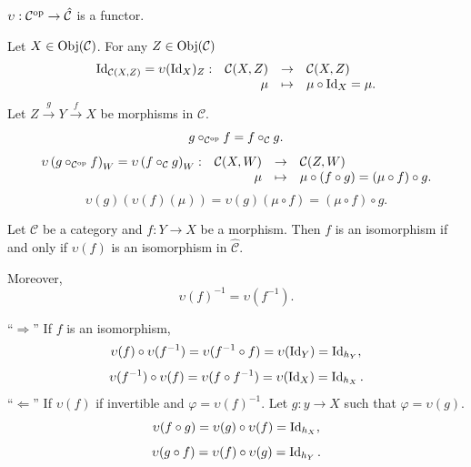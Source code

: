 \begin{propositionenv}
    $\upsilon: \mathcal{C}^{\mathrm{op}}\rightarrow\hat{\mathcal{C}}$ is a functor.
\end{propositionenv}
\begin{proofenv}
    Let $X\in \operatorname{\mathrm{Obj}}(\mathcal{C})$. For any $Z\in \operatorname{\mathrm{Obj}}(\mathcal{C})$
    $$\begin{array}{rrcl}
        \operatorname{\mathrm{Id}}_{\mathcal{C}(X,Z)}=\upsilon(\operatorname{\mathrm{Id}}_{X})_Z:&\mathcal{C}(X,Z)&\rightarrow&\mathcal{C}(X,Z)\\
        &\mu&\mapsto&\mu\circ\operatorname{\mathrm{Id}}_X=\mu.
    \end{array}
    $$
    Let $Z\overset{g}{\longrightarrow}Y\overset{f}{\longrightarrow}X$ be morphisms in $\mathcal{C}$.
    $$g\circ_{\mathcal{C}^{\mathrm{op}}} f=f\circ_{\mathcal{C}} g.$$
    $$\begin{array}{rrcl}
        \upsilon\left(g\circ_{\mathcal{C}^{\mathrm{op}}} f\right)_{W}= \upsilon\left(f\circ_{\mathcal{C}}g\right)_{W} :& \mathcal{C}(X,W)&\rightarrow &\mathcal{C}(Z,W)\\
        &\mu &\mapsto & \mu\circ \left(f\circ g\right)= \left(\mu\circ f\right)\circ g.
    \end{array}
    $$
    $$\upsilon(g)\left(\upsilon(f)(\mu)\right) = \upsilon(g)\left(\mu\circ f\right) = \left(\mu\circ f\right)\circ g.$$
\end{proofenv}
\begin{propositionenv}
    Let $\mathcal{C}$ be a category and $f:Y\rightarrow X$ be a morphism. Then $f$ is an isomorphism if and only if $\upsilon(f)$ is an isomorphism in $\hat{\mathcal{C}}$.

    Moreover, $$\upsilon(f)^{-1} = \upsilon(f^{-1}).$$
\end{propositionenv}
\begin{proofenv}\quad \newline
    ``$\Rightarrow$'' If $f$ is an isomorphism,
    $$ \upsilon(f)\circ \upsilon(f^{-1}) = \upsilon(f^{-1}\circ f) = \upsilon(\operatorname{\mathrm{Id}}_Y) = \operatorname{\mathrm{Id}}_{h_Y},$$
    $$ \upsilon(f^{-1})\circ \upsilon(f) = \upsilon(f\circ f^{-1}) = \upsilon(\operatorname{\mathrm{Id}}_X) =\operatorname{\mathrm{Id}}_{h_X}.$$
    ``$\Leftarrow$'' If $\upsilon(f)$ if invertible and $\varphi = \upsilon(f)^{-1}$. Let $g:y\rightarrow X$ such that $\varphi=\upsilon(g)$.
    $$\upsilon(f\circ g) =\upsilon(g)\circ \upsilon(f) =\operatorname{\mathrm{Id}}_{h_X},$$
    $$\upsilon(g\circ f) = \upsilon(f)\circ \upsilon(g) = \operatorname{\mathrm{Id}}_{h_Y}.$$
\end{proofenv}
\newpage

